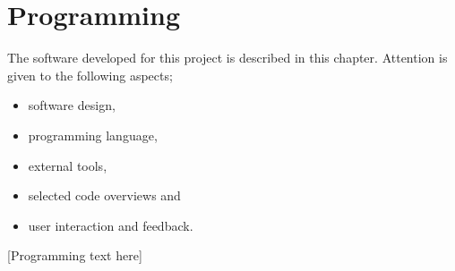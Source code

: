 \chapter{Programming}\label{chap:prog}
\begin{overview}
  The software developed for this project is described in this chapter.
  Attention is given to the following aspects;
  \begin{itemize}
    \item software design,
    \item programming language,
    \item external tools,
    \item selected code overviews and
    \item user interaction and feedback.
  \end{itemize}
\end{overview}

[Programming text here]

